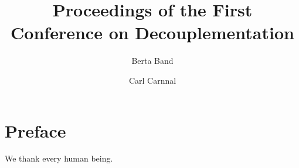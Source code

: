 \documentclass[%
  english,%
  trtype=proceedings%
]{hpitr}
\title{Proceedings of the First Conference on Decouplementation}
\author{Berta Band\and Carl Carnnal}
\date{}
\begin{document}
\maketitle
\frontmatter
\chapter*{Preface}

We thank every human being.

\tableofcontents
\mainmatter
{}
\end{document}
